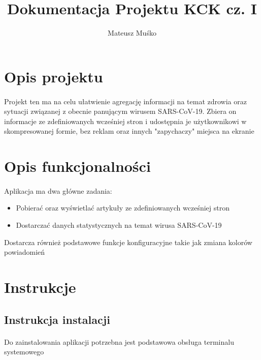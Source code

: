 \documentclass{article}
\author{Mateusz Muśko}
\title{Dokumentacja Projektu KCK cz. I}
\begin{document}
\maketitle
\tableofcontents

\section{Opis projektu}

\paragraph{}

Projekt ten ma na celu ułatwienie agregację informacji na temat zdrowia oraz sytuacji związanej z obecnie panującym wirusem SARS-CoV-19. Zbiera on informacje ze zdefiniowanych wcześniej stron i udostępnia je użytkownikowi w skompresowanej formie, bez reklam oraz innych "zapychaczy" miejsca na ekranie

\section{Opis funkcjonalności}

\paragraph{}
Aplikacja ma dwa główne zadania:
\begin{itemize}
    \item Pobierać oraz wyświetlać artykuły ze zdefiniowanych wcześniej stron
    \item Dostarczać danych statystycznych na temat wirusa SARS-CoV-19
\end{itemize}
Dostarcza również podstawowe funkcje konfiguracyjne takie jak zmiana kolorów powiadomień

\section{Instrukcje}

\subsection{Instrukcja instalacji}

\paragraph{}
Do zainstalowania aplikacji potrzebna jest podstawowa obsługa terminalu systemowego
\end{document}

